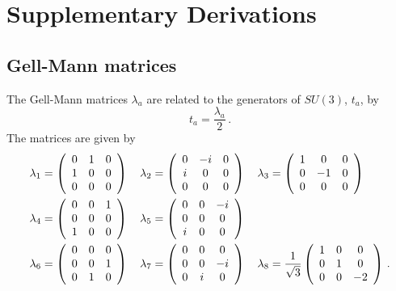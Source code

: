 \chapter{Supplementary Derivations}
\section{Gell-Mann matrices}\label{app:GellMann}
The Gell-Mann matrices $\lambda_a$ are related to the generators of $SU(3)$, $t_a$, by
%
\begin{equation}
t_a = \frac{\lambda_a}{2}\, .
\end{equation}
%
The matrices are given by
%
\begin{align*}
\lambda _ { 1 } &= \left( \begin{array} { c c c } { 0 } & { 1 } & { 0 } \\ { 1 } & { 0 } & { 0 } \\ { 0 } & { 0 } & { 0 } \end{array} \right) \quad \lambda _ { 2 } = \left( \begin{array} { c c c } { 0 } & { - i } & { 0 } \\ { i } & { 0 } & { 0 } \\ { 0 } & { 0 } & { 0 } \end{array} \right) \quad \lambda _ { 3 } = \left( \begin{array} { c c c } { 1 } & { 0 } & { 0 } \\ { 0 } & { - 1 } & { 0 } \\ { 0 } & { 0 } & { 0 } \end{array} \right)\\
\lambda _ { 4 } &= \left( \begin{array} { c c c } { 0 } & { 0 } & { 1 } \\ { 0 } & { 0 } & { 0 } \\ { 1 } & { 0 } & { 0 } \end{array} \right) \quad \lambda _ { 5 } = \left( \begin{array} { c c c } { 0 } & { 0 } & { - i } \\ { 0 } & { 0 } & { 0 } \\ { i } & { 0 } & { 0 } \end{array} \right)\\
\lambda _ { 6 } &= \left( \begin{array} { c c c } { 0 } & { 0 } & { 0 } \\ { 0 } & { 0 } & { 1 } \\ { 0 } & { 1 } & { 0 } \end{array} \right) \quad \lambda _ { 7 } = \left( \begin{array} { c c c } { 0 } & { 0 } & { 0 } \\ { 0 } & { 0 } & { - i } \\ { 0 } & { i } & { 0 } \end{array} \right) \quad \lambda _ { 8 } = \frac { 1 } { \sqrt { 3 } } \left( \begin{array} { c c c } { 1 } & { 0 } & { 0 } \\ { 0 } & { 1 } & { 0 } \\ { 0 } & { 0 } & { - 2 } \end{array} \right)\, .

\end{align*}
